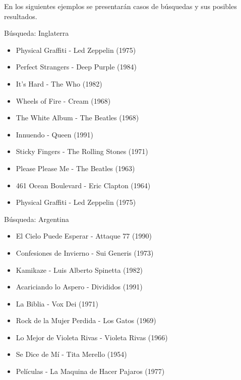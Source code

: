 En los siguientes ejemplos se presentarán casos de búsquedas y sus posibles resultados.

\begin{mybox}{Búsqueda: Inglaterra}
\begin{itemize}
	\item {\scriptsize Physical Graffiti - Led Zeppelin (1975)}
	\item {\scriptsize Perfect Strangers - Deep Purple (1984)}
	\item {\scriptsize It's Hard - The Who  (1982)}
	\item {\scriptsize Wheels of Fire - Cream (1968)}
	\item {\scriptsize The White Album - The Beatles (1968)}
	\item {\scriptsize Innuendo - Queen (1991)}
	\item {\scriptsize Sticky Fingers - The Rolling Stones (1971)}
	\item {\scriptsize Please Please Me - The Beatles (1963)}
	\item {\scriptsize 461 Ocean Boulevard - Eric Clapton (1964)}
	\item {\scriptsize Physical Graffiti - Led Zeppelin (1975)}
\end{itemize}
\end{mybox}

\begin{mybox}{Búsqueda: Argentina}
\begin{itemize}
	\item {\scriptsize El Cielo Puede Esperar - Attaque 77 (1990)}
	\item {\scriptsize Confesiones de Invierno - Sui Generis (1973)}
	\item {\scriptsize Kamikaze - Luis Alberto Spinetta (1982)}
	\item {\scriptsize Acariciando lo Aspero - Divididos (1991)}
	\item {\scriptsize La Biblia - Vox Dei (1971)}
	\item {\scriptsize Rock de la Mujer Perdida - Los Gatos (1969)}
	\item {\scriptsize Lo Mejor de Violeta Rivas - Violeta Rivas (1966)}
	\item {\scriptsize Se Dice de Mí - Tita Merello (1954)}
	\item {\scriptsize Películas - La Maquina de Hacer Pajaros (1977)}
\end{itemize}
\end{mybox}


